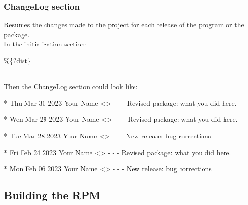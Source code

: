 \clearpage
\subsubsection{ChangeLog section}
\label{rpmlog}

Resumes the changes made to the project for each release of the program or the package. \\[0.25cm]
In the initialization section:
{\footnotesize{
\begin{script}
   
   \%\{?dist\}
\end{script}
}}
\\
\noindent Then the ChangeLog section could look like:
{\footnotesize{
\begin{script}
* Thu Mar 30 2023 Your Name <\email> - -
- Revised package: what you did here.

* Wen Mar 29 2023 Your Name <\email> - -
- Revised package: what you did here.

* Tue Mar 28 2023 Your Name <\email> - -
- New release: bug corrections

* Fri Feb 24 2023 Your Name <\email> - -
- Revised package: what you did here.

* Mon Feb 06 2023 Your Name <\email> - -
- New release: bug corrections
\end{script}
}}

\newpage
\subsection{Building the RPM}

